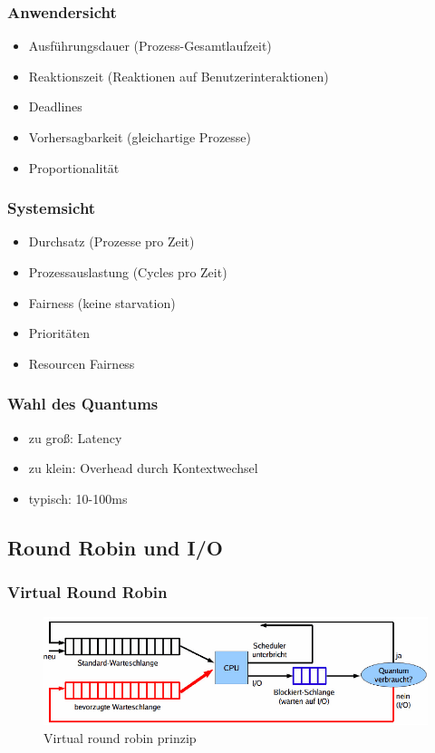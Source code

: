 \subsubsection{Anwendersicht}
\begin{itemize}
    \item Ausführungsdauer (Prozess-Gesamtlaufzeit)
    \item Reaktionszeit (Reaktionen auf Benutzerinteraktionen)
    \item Deadlines
    \item Vorhersagbarkeit (gleichartige Prozesse)
    \item Proportionalität
\end{itemize}

\subsubsection{Systemsicht}
\begin{itemize}
    \item Durchsatz (Prozesse pro Zeit)
    \item Prozessauslastung (Cycles pro Zeit)
    \item Fairness (keine starvation)
    \item Prioritäten
    \item Resourcen Fairness
\end{itemize}

\subsubsection{Wahl des Quantums}
\begin{itemize}
    \item zu groß: Latency
    \item zu klein: Overhead durch Kontextwechsel
    \item typisch: 10-100ms
\end{itemize}

\subsection{Round Robin und I/O}
\subsubsection{Virtual Round Robin}
\begin{figure}[ht!]
    \includegraphics[scale=.4]{pics/virtual_round_robin}
    \caption{Virtual round robin prinzip}
\end{figure}

